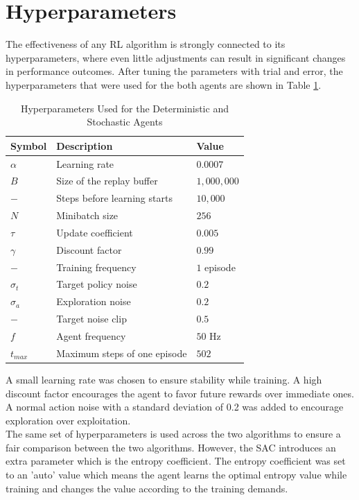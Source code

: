     \section{Hyperparameters}
    The effectiveness of any RL algorithm is strongly connected to its hyperparameters, where even little adjustments can result in significant changes in performance outcomes. After tuning the parameters with trial and error, the hyperparameters that were used for the both agents are shown in Table \ref{hyper}.
    \begin{table}[H]
    \centering
    \begin{tabular}{lll}
    \hline
    Symbol & Description & Value \\
    \hline
    $\alpha$ & Learning rate & $0.0007$ \\
    $B$ & Size of the replay buffer &  $1,000,000$\\
    $-$& Steps before learning starts  & $10,000$ \\
    $N$ & Minibatch size & $256$ \\
    $\tau$ & Update coefficient  & $0.005$ \\
    $\gamma$ & Discount factor & $0.99$ \\
    $-$ & Training frequency  & $1$ episode  \\
    $\sigma_{t}$ & Target policy noise  & $0.2$ \\
    $\sigma_{a}$ & Exploration noise  & $0.2$ \\
    $-$ & Target noise clip & $0.5$ \\
    $f$ & Agent frequency  & $50$ Hz \\
    $t_{max}$  & Maximum steps of one episode  & $502$ \\
    \hline
    \end{tabular}    
    \caption{Hyperparameters Used for the Deterministic and Stochastic Agents}
    \label{hyper}
    \end{table}
    A small learning rate was chosen to ensure stability while training. A high discount factor encourages the agent to favor future rewards over immediate ones. A normal action noise with a standard deviation of 0.2 was added to encourage exploration over exploitation.\\
    The same set of hyperparameters is used across the two algorithms to ensure a fair comparison between the two algorithms. However, the SAC introduces an extra parameter which is the entropy coefficient. The entropy coefficient was set to an 'auto' value which means the agent learns the optimal entropy value while training and changes the value according to the training demands.\clearpage
